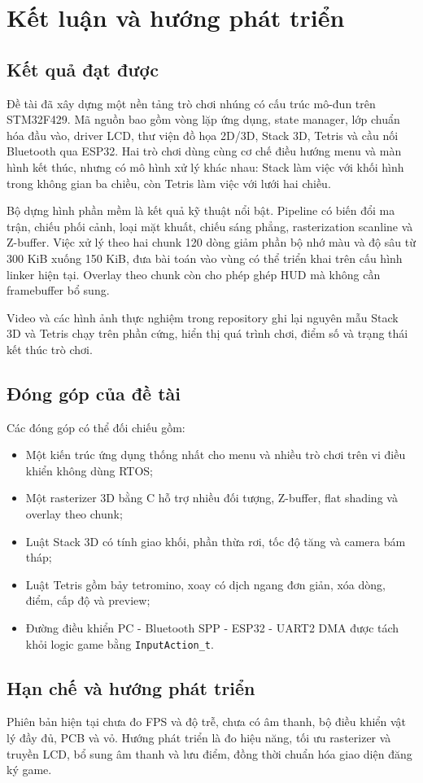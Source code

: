 \chapter{Kết luận và hướng phát triển}
\label{chap:conclusion}

\section{Kết quả đạt được}

Đề tài đã xây dựng một nền tảng trò chơi nhúng có cấu trúc mô-đun trên STM32F429. Mã nguồn bao gồm vòng lặp ứng dụng, state manager, lớp chuẩn hóa đầu vào, driver LCD, thư viện đồ họa 2D/3D, Stack 3D, Tetris và cầu nối Bluetooth qua ESP32. Hai trò chơi dùng cùng cơ chế điều hướng menu và màn hình kết thúc, nhưng có mô hình xử lý khác nhau: Stack làm việc với khối hình trong không gian ba chiều, còn Tetris làm việc với lưới hai chiều.

Bộ dựng hình phần mềm là kết quả kỹ thuật nổi bật. Pipeline có biến đổi ma trận, chiếu phối cảnh, loại mặt khuất, chiếu sáng phẳng, rasterization scanline và Z-buffer. Việc xử lý theo hai chunk 120 dòng giảm phần bộ nhớ màu và độ sâu từ 300 KiB xuống 150 KiB, đưa bài toán vào vùng có thể triển khai trên cấu hình linker hiện tại. Overlay theo chunk còn cho phép ghép HUD mà không cần framebuffer bổ sung.

Video và các hình ảnh thực nghiệm trong repository ghi lại nguyên mẫu Stack 3D và Tetris chạy trên phần cứng, hiển thị quá trình chơi, điểm số và trạng thái kết thúc trò chơi.

\section{Đóng góp của đề tài}

Các đóng góp có thể đối chiếu gồm:
\begin{itemize}
  \item Một kiến trúc ứng dụng thống nhất cho menu và nhiều trò chơi trên vi điều khiển không dùng RTOS;
  \item Một rasterizer 3D bằng C hỗ trợ nhiều đối tượng, Z-buffer, flat shading và overlay theo chunk;
  \item Luật Stack 3D có tính giao khối, phần thừa rơi, tốc độ tăng và camera bám tháp;
  \item Luật Tetris gồm bảy tetromino, xoay có dịch ngang đơn giản, xóa dòng, điểm, cấp độ và preview;
  \item Đường điều khiển PC - Bluetooth SPP - ESP32 - UART2 DMA được tách khỏi logic game bằng \texttt{InputAction\_t}.
\end{itemize}

\section{Hạn chế và hướng phát triển}

Phiên bản hiện tại chưa đo FPS và độ trễ, chưa có âm thanh, bộ điều khiển vật lý đầy đủ, PCB và vỏ. Hướng phát triển là đo hiệu năng, tối ưu rasterizer và truyền LCD, bổ sung âm thanh và lưu điểm, đồng thời chuẩn hóa giao diện đăng ký game.
